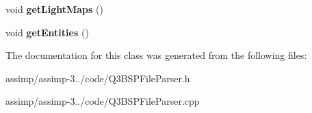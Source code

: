 \begin{DoxyCompactItemize}
\item 
\hypertarget{class_assimp_1_1_q3_b_s_p_file_parser_a89490b5973b41fe2865623a479e1ca1a}{void {\bfseries get\+Light\+Maps} ()}\label{class_assimp_1_1_q3_b_s_p_file_parser_a89490b5973b41fe2865623a479e1ca1a}

\item 
\hypertarget{class_assimp_1_1_q3_b_s_p_file_parser_a735f5068f5b361d734d1394a09ecd6ab}{void {\bfseries get\+Entities} ()}\label{class_assimp_1_1_q3_b_s_p_file_parser_a735f5068f5b361d734d1394a09ecd6ab}

\end{DoxyCompactItemize}


The documentation for this class was generated from the following files\+:\begin{DoxyCompactItemize}
\item 
assimp/assimp-\/3../code/Q3\+B\+S\+P\+File\+Parser.\+h\item 
assimp/assimp-\/3../code/Q3\+B\+S\+P\+File\+Parser.\+cpp\end{DoxyCompactItemize}
